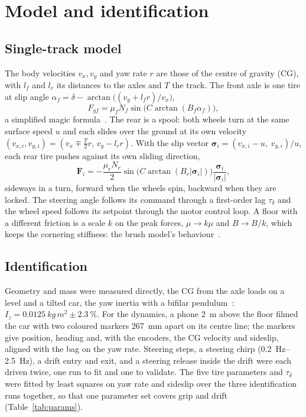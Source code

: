 \documentclass[conference]{IEEEtran}
\begin{document}
\section{Model and identification}\label{sec:model}

\subsection{Single-track model}

The body velocities $v_x, v_y$ and yaw rate $r$ are those of the centre of gravity (CG), with $l_f$ and $l_r$ its
distances to the axles and $T$ the track. The front axle is one tire at slip angle
$\alpha_f = \delta - \arctan\big((v_y + l_f r)/v_x\big)$,
\begin{equation}
F_{yf} = \mu_f N_f \sin\!\big(C \arctan(B_f \alpha_f)\big),
\end{equation}
a simplified magic formula~\cite{pacejka2012}. The rear is a spool: both wheels turn at the same surface speed $u$
and each slides over the ground at its own velocity $(v_{x,i}, v_{y,i}) = (v_x \mp \tfrac{T}{2} r,\, v_y - l_r r)$.
With the slip vector $\boldsymbol{\sigma}_i = (v_{x,i} - u,\; v_{y,i})/u$, each rear tire pushes against its own
sliding direction,
\begin{equation}
\mathbf{F}_i = -\frac{\mu_r N_r}{2} \sin\!\big(C \arctan(B_r |\boldsymbol{\sigma}_i|)\big)
\frac{\boldsymbol{\sigma}_i}{|\boldsymbol{\sigma}_i|},
\end{equation}
sideways in a turn, forward when the wheels spin, backward when they are locked. The steering angle follows its
command through a first-order lag $\tau_\delta$ and the wheel speed follows its setpoint through the motor control
loop. A floor with a different friction is a scale $k$ on the peak forces, $\mu \to k\mu$ and $B \to B/k$, which
keeps the cornering stiffness: the brush model's behaviour~\cite{pacejka2012}.

\subsection{Identification}

Geometry and mass were measured directly, the CG from the axle loads on a level and a tilted car, the yaw inertia
with a bifilar pendulum~\cite{jardin2009}: $I_z = \SI{0.0125}{kg\,m^2} \pm \SI{2.3}{\percent}$. For the dynamics,
a phone \SI{2}{m} above the floor filmed the car with two coloured markers \SI{267}{mm} apart on its centre line; the
markers give position, heading and, with the encoders, the CG velocity and sideslip, aligned with the bag on the
yaw rate. Steering steps, a steering chirp (\SIrange{0.2}{2.5}{Hz}), a drift entry and exit, and a steering release
inside the drift were each driven twice, one run to fit and one to validate. The five tire parameters and
$\tau_\delta$ were fitted by least squares on yaw rate and sideslip over the three identification runs together,
so that one parameter set covers grip and drift (Table~\ref{tab:params}).
\end{document}
